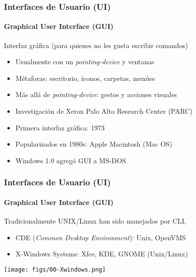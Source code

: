 \documentclass[letter]{beamer}
\begin{document}
%
%
\begin{frame}
  \frametitle{Interfaces de Usuario (UI)}
  \framesubtitle{Graphical User Interface (GUI)}

  Interfaz gráfica (para quienes no les gusta escribir comandos)
  
  \begin{itemize}
    \item<2-> Usualmente con un {\em pointing-device} y ventanas
    \item<2-> Métaforas: escritorio, íconos, carpetas, menúes
    \item<2-> Más allá de {\em pointing-device}: gestos y acciones visuales
  \end{itemize}
  
  \begin{itemize}
    \item<4-> Investigación de Xerox Palo Alto Research Center (PARC)
    \item<4-> Primera interfaz gráfica: 1973
    \item<4-> Popularizados en 1980s: Apple Macintosh (Mac OS)
    \item<4-> Windows 1.0 agregó GUI a MS-DOS
  \end{itemize}


\end{frame}

\begin{frame}
  \frametitle{Interfaces de Usuario (UI)}
  \framesubtitle{Graphical User Interface (GUI)}

  Tradicionalmente UNIX/Linux han sido manejados por CLI,
  \begin{itemize}
    \item<3-> CDE ({\em Common Desktop Environment}): Unix, OpenVMS
    \item<3-> X-Windows Systems: Xfce, KDE, GNOME (Unix/Linux)
  \end{itemize}
  
  \begin{center}
    \texttt{[image: figs/00-Xwindows.png]}
  \end{center}

\end{frame}
\end{document}
